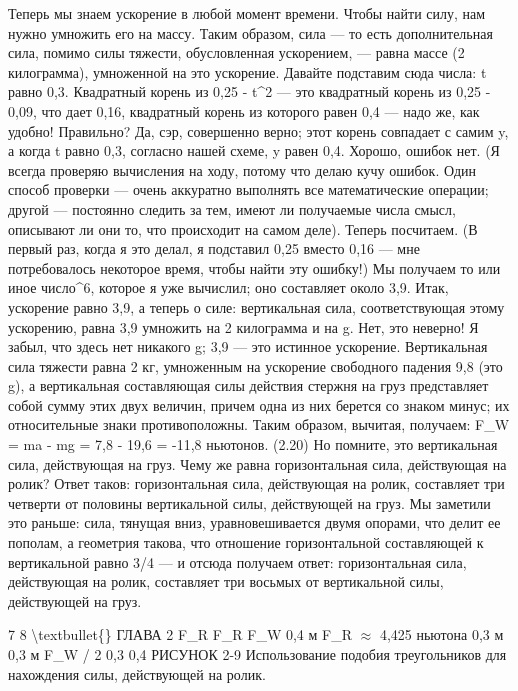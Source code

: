 \documentclass[10pt,oneside]{article}
\begin{document}
Теперь мы знаем ускорение в любой момент времени. Чтобы найти силу, нам нужно умножить его на массу. Таким образом, сила --- то есть дополнительная сила, помимо силы тяжести, обусловленная ускорением, --- равна массе (2 килограмма), умноженной на это ускорение. Давайте подставим сюда числа: t равно 0,3. Квадратный корень из 0,25 - t\textasciicircum{}2 --- это квадратный корень из 0,25 - 0,09, что дает 0,16, квадратный корень из которого равен 0,4 --- надо же, как удобно! Правильно? Да, сэр, совершенно верно; этот корень совпадает с самим y, а когда t равно 0,3, согласно нашей схеме, y равен 0,4. Хорошо, ошибок нет. (Я всегда проверяю вычисления на ходу, потому что делаю кучу ошибок. Один способ проверки --- очень аккуратно выполнять все математические операции; другой --- постоянно следить за тем, имеют ли получаемые числа смысл, описывают ли они то, что происходит на самом деле). Теперь посчитаем. (В первый раз, когда я это делал, я подставил 0,25 вместо 0,16 --- мне потребовалось некоторое время, чтобы найти эту ошибку!) Мы получаем то или иное число\textasciicircum{}6, которое я уже вычислил; оно составляет около 3,9. Итак, ускорение равно 3,9, а теперь о силе: вертикальная сила, соответствующая этому ускорению, равна 3,9 умножить на 2 килограмма и на g. Нет, это неверно! Я забыл, что здесь нет никакого g; 3,9 --- это истинное ускорение. Вертикальная сила тяжести равна 2 кг, умноженным на ускорение свободного падения 9,8 (это g), а вертикальная составляющая силы действия стержня на груз представляет собой сумму этих двух величин, причем одна из них берется со знаком минус; их относительные знаки противоположны. Таким образом, вычитая, получаем: F\_W = ma - mg = 7,8 - 19,6 = -11,8 ньютонов. (2.20) Но помните, это вертикальная сила, действующая на груз. Чему же равна горизонтальная сила, действующая на ролик? Ответ таков: горизонтальная сила, действующая на ролик, составляет три четверти от половины вертикальной силы, действующей на груз. Мы заметили это раньше: сила, тянущая вниз, уравновешивается двумя опорами, что делит ее пополам, а геометрия такова, что отношение горизонтальной составляющей к вертикальной равно 3/4 --- и отсюда получаем ответ: горизонтальная сила, действующая на ролик, составляет три восьмых от вертикальной силы, действующей на груз.\par

7 8 \textbackslash{}textbullet\{\} ГЛАВА 2 F\_R F\_R F\_W 0,4 м F\_R \ensuremath{\approx} 4,425 ньютона 0,3 м 0,3 м F\_W / 2 0,3 0,4 РИСУНОК 2-9 Использование подобия треугольников для нахождения силы, действующей на ролик.\par
\end{document}
